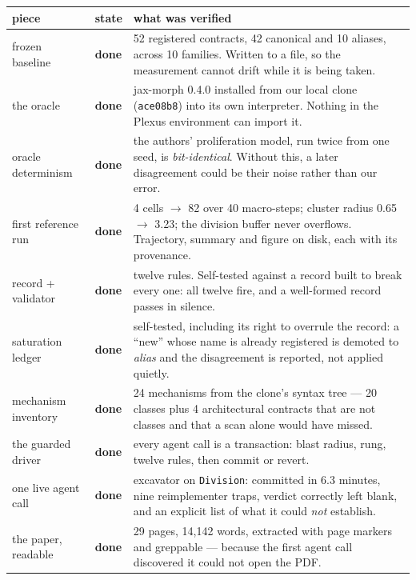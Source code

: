 \documentclass[11pt,a4paper]{article}
\newcommand{\code}[1]{\texttt{#1}}
\newcommand{\dn}{\textcolor{good}{\textbf{done}}}
\begin{document}
\begin{center}
\small
\begin{tabular}{@{}p{4.3cm} l p{8.7cm}@{}}
\toprule
\textbf{piece} & \textbf{state} & \textbf{what was verified}\\
\midrule
frozen baseline & \dn &
52 registered contracts, 42 canonical and 10 aliases, across 10 families. Written to a file, so
the measurement cannot drift while it is being taken.\\

the oracle & \dn &
jax-morph 0.4.0 installed from our local clone (\code{ace08b8}) into its own interpreter. Nothing
in the Plexus environment can import it.\\

oracle determinism & \dn &
the authors' proliferation model, run twice from one seed, is \emph{bit-identical}. Without this,
a later disagreement could be their noise rather than our error.\\

first reference run & \dn &
4 cells $\to$ 82 over 40 macro-steps; cluster radius 0.65 $\to$ 3.23; the division buffer never
overflows. Trajectory, summary and figure on disk, each with its provenance.\\

record + validator & \dn &
twelve rules. Self-tested against a record built to break every one: all twelve fire, and a
well-formed record passes in silence.\\

saturation ledger & \dn &
self-tested, including its right to overrule the record: a ``new'' whose name is already
registered is demoted to \emph{alias} and the disagreement is reported, not applied quietly.\\

mechanism inventory & \dn &
24 mechanisms from the clone's syntax tree --- 20 classes plus 4 architectural contracts that are
not classes and that a scan alone would have missed.\\

the guarded driver & \dn &
every agent call is a transaction: blast radius, rung, twelve rules, then commit or revert.\\

one live agent call & \dn &
excavator on \code{Division}: committed in 6.3 minutes, nine reimplementer traps, verdict
correctly left blank, and an explicit list of what it could \emph{not} establish.\\

the paper, readable & \dn &
29 pages, 14{,}142 words, extracted with page markers and greppable --- because the first agent
call discovered it could not open the PDF.\\
\bottomrule
\end{tabular}
\end{center}
\end{document}
